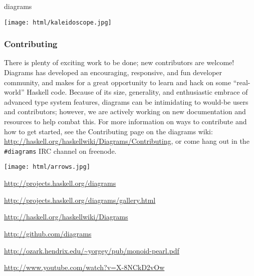 \begin{hcarentry}[updated]{diagrams}
\begin{center}
\texttt{[image: html/kaleidoscope.jpg]}
\end{center}

\subsubsection*{Contributing}

There is plenty of exciting work to be done; new contributors are
welcome!  Diagrams has developed an encouraging, responsive, and fun
developer community, and makes for a great opportunity to learn and
hack on some ``real-world'' Haskell code.  Because of its size,
generality, and enthusiastic embrace of advanced type system features,
diagrams can be intimidating to would-be users and contributors;
however, we are actively working on new documentation and resources to
help combat this.  For more information on ways to contribute and how
to get started, see the Contributing page on the diagrams wiki:
\url{http://haskell.org/haskellwiki/Diagrams/Contributing}, or come
hang out in the \texttt{\#diagrams} IRC channel on freenode.

\begin{center}
\texttt{[image: html/arrows.jpg]}
\end{center}

\FurtherReading
\begin{compactitem}
\item \url{http://projects.haskell.org/diagrams}
\item \url{http://projects.haskell.org/diagrams/gallery.html}
\item \url{http://haskell.org/haskellwiki/Diagrams}
\item \url{http://github.com/diagrams}
\item \url{http://ozark.hendrix.edu/~yorgey/pub/monoid-pearl.pdf}
\item \url{http://www.youtube.com/watch?v=X-8NCkD2vOw}
\end{compactitem}
\end{hcarentry}
